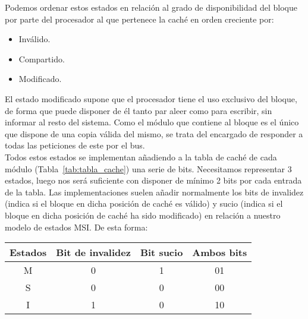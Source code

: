 Podemos ordenar estos estados en relación al grado de disponibilidad del bloque por parte del procesador al que pertenece la caché en orden creciente por:
\begin{itemize}
    \item Inválido.
    \item Compartido.
    \item Modificado.
\end{itemize}
El estado modificado supone que el procesador tiene el uso exclusivo del bloque, de forma que puede disponer de él tanto par aleer como para escribir, sin informar al resto del sistema. Como el módulo que contiene al bloque es el único que dispone de una copia válida del mismo, se trata del encargado de responder a todas las peticiones de este por el bus.\\

Todos estos estados se implementan añadiendo a la tabla de caché de cada módulo (Tabla~\ref{tab:tabla_cache}) una serie de bits. Necesitamos representar 3 estados, luego nos será suficiente con disponer de mínimo 2 bits por cada entrada de la tabla. Las implementaciones suelen añadir normalmente los bits de invalidez (indica si el bloque en dicha posición de caché es válido) y sucio (indica si el bloque en dicha posición de caché ha sido modificado) en relación a nuestro modelo de estados MSI\@. De esta forma:
\begin{table}[H]
\centering
\begin{tabular}{c c c c}
    Estados & Bit de invalidez & Bit sucio & Ambos bits \\
    \midrule
    M & 0 & 1 & 01 \\
    S & 0 & 0 & 00 \\
    I & 1 & 0 & 10
\end{tabular}
\end{table}

